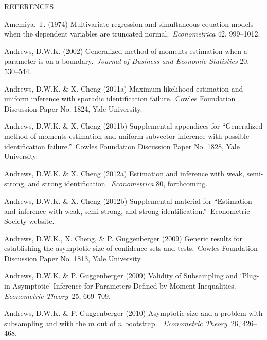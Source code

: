 \documentclass[12pt,thmsb,titlepage,final,oneside,letterpaper]{article}
\begin{document}
\newpage

\begin{center}
{\LARGE R}{\Large EFERENCES}
\end{center}

\begin{description}
\item Amemiya, T. (1974) Multivariate regression and simultaneous-equation
models when the dependent variables are truncated normal.\ \emph{Econometrica%
} 42, 999--1012.

\item Andrews, D.W.K. (2002) Generalized method of moments estimation when a
parameter is on a boundary.\ \emph{Journal of Business and Economic
Statistics} 20, 530--544.

\item Andrews, D.W.K. \& X. Cheng (2011a) Maximum likelihood estimation and
uniform inference with sporadic identification failure.\ Cowles Foundation
Discussion Paper No. 1824, Yale University.

\item Andrews, D.W.K. \& X. Cheng (2011b) Supplemental appendices for
\textquotedblleft Generalized method of moments estimation and uniform
subvector inference with possible identification failure.\textquotedblright\
Cowles Foundation Discussion Paper No. 1828, Yale University.

\item Andrews, D.W.K. \& X. Cheng (2012a) Estimation and inference with
weak, semi-strong, and strong identification.\ \emph{Econometrica }80,
forthcoming.

\item Andrews, D.W.K. \& X. Cheng (2012b) Supplemental material for
\textquotedblleft Estimation and inference with weak, semi-strong, and
strong identification.\textquotedblright\ Econometric Society website.

\item Andrews, D.W.K., X. Cheng, \& P. Guggenberger (2009) Generic results
for establishing the asymptotic size of confidence sets and tests.\ Cowles
Foundation Discussion Paper No. 1813, Yale University.

\item Andrews, D.W.K. \& P. Guggenberger (2009) Validity of Subsampling and
`Plug-in Asymptotic' Inference for Parameters Defined by Moment
Inequalities. \emph{Econometric Theory}\textit{\ }25, 669--709.

\item Andrews, D.W.K. \& P. Guggenberger (2010) Asymptotic size and a
problem with subsampling and with the $m$ out of $n$ bootstrap.\ \emph{%
Econometric Theory}\textit{\ }26, 426--468.


\end{description}
\end{document}
